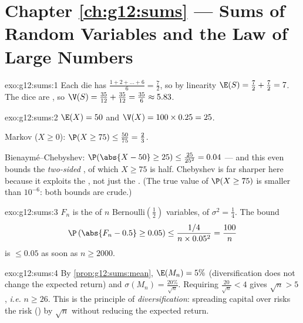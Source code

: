 \section*{Chapter \ref{ch:g12:sums} --- Sums of Random Variables and the Law of Large Numbers}

\begin{solution}{exo:g12:sums:1}
Each die has 
$\frac{1 + 2 + \dots + 6}{6} = \frac{7}{2}$, so by linearity
$\E(S) = \frac72 + \frac72 = 7$. The dice are , so
$\V(S) = \frac{35}{12} + \frac{35}{12} = \frac{35}{6} \approx 5.83$.
\end{solution}

\begin{solution}{exo:g12:sums:2}
$\E(X) = 50$ and $\V(X) = 100 \times 0.25 = 25$.

Markov ($X \geq 0$): $\P(X \geq 75) \leq \frac{50}{75} = \frac23$.

Bienaymé--Chebyshev:
$\P(\abs{X - 50} \geq 25) \leq \frac{25}{25^2} = 0.04$ --- and this even
bounds the \emph{two-sided} , of which $X \geq 75$ is half. Chebyshev
is far sharper here because it exploits the , not just the .
(The true value of $\P(X \geq 75)$ is smaller than $10^{-6}$: both bounds
are crude.)
\end{solution}

\begin{solution}{exo:g12:sums:3}
$F_n$ is the  of $n$ Bernoulli$\left(\frac12\right)$ variables,
of  $\sigma^2 = \frac14$. The bound
\[
\P\left(\abs{F_n - 0.5} \geq 0.05\right)
\leq \frac{1/4}{n \times 0.05^2} = \frac{100}{n}
\]
is $\leq 0.05$ as soon as $n \geq 2000$.
\end{solution}

\begin{solution}{exo:g12:sums:4}
By \cref{prop:g12:sums:mean}, $\E(M_n) = 5\%$ (diversification does not
change the expected return) and
$\sigma(M_n) = \frac{20\%}{\sqrt n}$. Requiring
$\frac{20}{\sqrt n} < 4$ gives $\sqrt n > 5$, \emph{i.e.} $n \geq 26$.
This is the principle of \emph{diversification}: spreading capital over
 risks  the risk () by $\sqrt n$
without reducing the expected return.
\end{solution}

